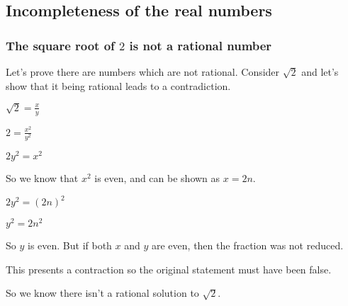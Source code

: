 
\subsection{Incompleteness of the real numbers}

\subsubsection{The square root of \(2\) is not a rational number}

Let's prove there are numbers which are not rational. Consider \(\sqrt 2\) and let's show that it being rational leads to a contradiction.

$\sqrt 2=\frac{x}{y}$

$2=\frac{x^2}{y^2}$

$2y^2=x^2$

So we know that \(x^2\) is even, and can be shown as \(x=2n\).

$2y^2=(2n)^2$

$y^2=2n^2$

So \(y\) is even. But if both \(x\) and \(y\) are even, then the fraction was not reduced.

This presents a contraction so the original statement must have been false.

So we know there isn't a rational solution to \(\sqrt 2\).


